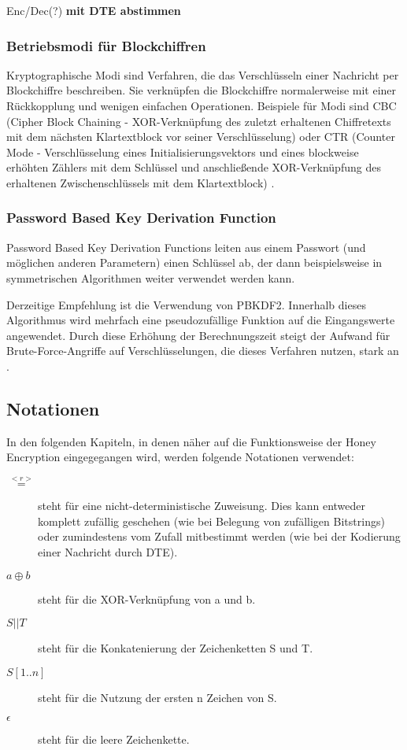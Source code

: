 Enc/Dec(?) \textbf{mit DTE abstimmen}

\subsubsection{Betriebsmodi für Blockchiffren}
Kryptographische Modi sind Verfahren, die das Verschlüsseln einer Nachricht per Blockchiffre beschreiben. Sie verknüpfen die Blockchiffre normalerweise mit einer Rückkopplung und wenigen einfachen Operationen. Beispiele für Modi sind CBC (Cipher Block Chaining - XOR-Verknüpfung des zuletzt erhaltenen Chiffretexts mit dem nächsten Klartextblock vor seiner Verschlüsselung) oder CTR (Counter Mode - Verschlüsselung eines Initialisierungsvektors und eines blockweise erhöhten Zählers mit dem Schlüssel und anschließende XOR-Verknüpfung des erhaltenen Zwischenschlüssels mit dem Klartextblock) \cite{Schneier2006}.

\subsubsection{Password Based Key Derivation Function}
Password Based Key Derivation Functions leiten aus einem Passwort (und möglichen anderen Parametern) einen Schlüssel ab, der dann beispielsweise in symmetrischen Algorithmen weiter verwendet werden kann.

Derzeitige Empfehlung ist die Verwendung von PBKDF2. Innerhalb dieses Algorithmus wird mehrfach eine pseudozufällige Funktion auf die Eingangswerte angewendet. Durch diese Erhöhung der Berechnungszeit steigt der Aufwand für Brute-Force-Angriffe auf Verschlüsselungen, die dieses Verfahren nutzen, stark an  \cite{pbkdf2000}.


\subsection{Notationen}

In den folgenden Kapiteln, in denen näher auf die Funktionsweise der Honey Encryption eingegegangen wird, werden folgende Notationen verwendet:

\begin{description}

\item[\(\overset{<r>}{=}\)] steht für eine nicht-deterministische Zuweisung. Dies kann entweder komplett zufällig geschehen (wie bei Belegung von zufälligen Bitstrings) oder zumindestens vom Zufall mitbestimmt werden (wie bei der Kodierung einer Nachricht durch DTE).

\item[\(a \oplus b\)] steht für die XOR-Verknüpfung von a und b.

\item[\(S || T\)] steht für die Konkatenierung der Zeichenketten S und T.

\item[\(S{[1..n]}\)] steht für die Nutzung der ersten n Zeichen von S.

\item[\(\epsilon\)] steht für die leere Zeichenkette.

\end{description}

\newpage